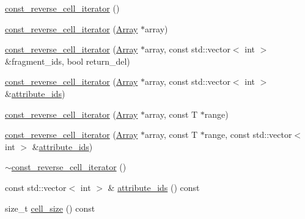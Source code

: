 \begin{DoxyCompactItemize}
\item 
\hyperlink{classStorageManager_1_1Array_1_1const__reverse__cell__iterator_a39c494e646fcc4700dc301229665eb22}{const\+\_\+reverse\+\_\+cell\+\_\+iterator} ()
\item 
\hyperlink{classStorageManager_1_1Array_1_1const__reverse__cell__iterator_a7778814f01a6600067edba1e6b3d710e}{const\+\_\+reverse\+\_\+cell\+\_\+iterator} (\hyperlink{classStorageManager_1_1Array}{Array} $\ast$array)
\item 
\hyperlink{classStorageManager_1_1Array_1_1const__reverse__cell__iterator_a3243c47a5b32b9e242cf024480dc7eb4}{const\+\_\+reverse\+\_\+cell\+\_\+iterator} (\hyperlink{classStorageManager_1_1Array}{Array} $\ast$array, const std\+::vector$<$ int $>$ \&fragment\+\_\+ids, bool return\+\_\+del)
\item 
\hyperlink{classStorageManager_1_1Array_1_1const__reverse__cell__iterator_add2de2158ea0892c3d47e6854f92a97f}{const\+\_\+reverse\+\_\+cell\+\_\+iterator} (\hyperlink{classStorageManager_1_1Array}{Array} $\ast$array, const std\+::vector$<$ int $>$ \&\hyperlink{classStorageManager_1_1Array_1_1const__reverse__cell__iterator_ad4e0c39197231c45db9faead252c2dd0}{attribute\+\_\+ids})
\item 
\hyperlink{classStorageManager_1_1Array_1_1const__reverse__cell__iterator_afcf9e32d2a0ba1eeb3f5543ed6db62e4}{const\+\_\+reverse\+\_\+cell\+\_\+iterator} (\hyperlink{classStorageManager_1_1Array}{Array} $\ast$array, const T $\ast$range)
\item 
\hyperlink{classStorageManager_1_1Array_1_1const__reverse__cell__iterator_ae041950dda2fe99f8a3d9aa0211da613}{const\+\_\+reverse\+\_\+cell\+\_\+iterator} (\hyperlink{classStorageManager_1_1Array}{Array} $\ast$array, const T $\ast$range, const std\+::vector$<$ int $>$ \&\hyperlink{classStorageManager_1_1Array_1_1const__reverse__cell__iterator_ad4e0c39197231c45db9faead252c2dd0}{attribute\+\_\+ids})
\item 
\hyperlink{classStorageManager_1_1Array_1_1const__reverse__cell__iterator_a1e64ec535427e572be20d364f25d04dc}{$\sim$const\+\_\+reverse\+\_\+cell\+\_\+iterator} ()
\item 
const std\+::vector$<$ int $>$ \& \hyperlink{classStorageManager_1_1Array_1_1const__reverse__cell__iterator_ad4e0c39197231c45db9faead252c2dd0}{attribute\+\_\+ids} () const 
\item 
size\+\_\+t \hyperlink{classStorageManager_1_1Array_1_1const__reverse__cell__iterator_ad1017ce348c44bb7623a8ad36b28bf92}{cell\+\_\+size} () const 

\end{DoxyCompactItemize}

